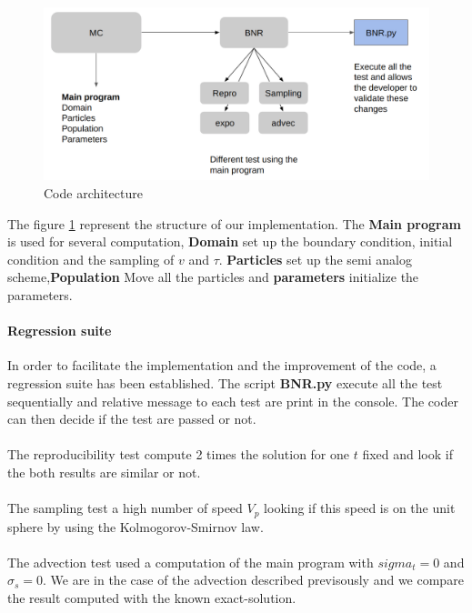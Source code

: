 \documentclass[a4paper, 11pt]{article}
\begin{document}
\begin{figure}[H]
	\centering
	\includegraphics[width=1.0\linewidth]{codestruct.png}
	\caption {Code architecture}
	\label{fig:code}
\end{figure}

The figure \ref{fig:code} represent the structure of our implementation. The \textbf{Main program} is used for several computation, \textbf{Domain} set up the boundary condition, initial condition and the sampling of $v$ and $\tau$. \textbf{Particles} set up the semi analog scheme,\textbf{Population} Move all the particles and \textbf{parameters} initialize the parameters.

\paragraph{Regression suite}

In order to facilitate the implementation and the improvement of the code, a regression suite has been established. The script \textbf{BNR.py} execute all the test sequentially and relative message to each test are print in the console. The coder can then decide if the test are passed or not.

\paragraph{}

The reproducibility test compute 2 times the solution for one $t$ fixed and look if the both results are similar or not.

\paragraph{}

The sampling test a high number of speed $V_p$ looking if this speed is on the unit sphere by using the Kolmogorov-Smirnov law.

\paragraph{}
The advection test used a computation of the main program with $sigma_t=0$ and $\sigma_s=0$. We are in the case of the advection described previsously and we compare the result computed with the known exact-solution.
\end{document}
